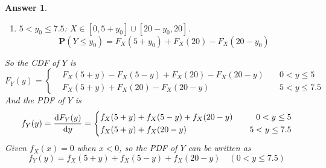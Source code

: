 \documentclass[utf8]{article}
\theoremstyle{definition}%
\theoremstyle{plain}%
\newtheorem{answer}{Answer} %
\begin{document}
\begin{answer}
\begin{enumerate}[label=(\alph*)]
\begin{equation}
            \end{equation}
        \item $5 < y_0 \leq 7.5$: $X \in [0, 5+y_0] \cup [20-y_0, 20]$.
            \begin{equation}
                \mathbf{P}(Y \leq y_0) = F_{X}(5+y_0) + F_{X}(20) - F_{X}(20-y_0)
            \end{equation}
    \end{enumerate}
    So the CDF of $Y$ is 
    \begin{equation}
        F_{Y}(y) = \left\{\begin{aligned}
            &F_{X}(5+y) - F_{X}(5-y) + F_{X}(20) - F_{X}(20-y) \quad &0 < y \leq 5 \\
            &F_{X}(5+y) + F_{X}(20) - F_{X}(20-y) \quad &5 < y \leq 7.5
        \end{aligned}\right.
    \end{equation}
    And the PDF of $Y$ is
    \begin{equation}
        f_{Y}(y) = \dv{F_{Y}(y)}{y} = \left\{\begin{aligned}
            &f_{X}(5+y) + f_{X}(5-y) + f_{X}(20-y) \quad &0 < y \leq 5 \\
            &f_{X}(5+y) + f_{X}(20-y) \quad &5 < y \leq 7.5
        \end{aligned}\right.
    \end{equation}
    Given $f_{X}(x) = 0$ when $x < 0$, so the PDF of $Y$ can be written as
    \begin{equation}
        f_{Y}(y) = f_{X}(5+y) + f_{X}(5-y) + f_{X}(20-y) \quad (0 < y \leq 7.5)
    \end{equation}
\end{answer}
\end{document}
